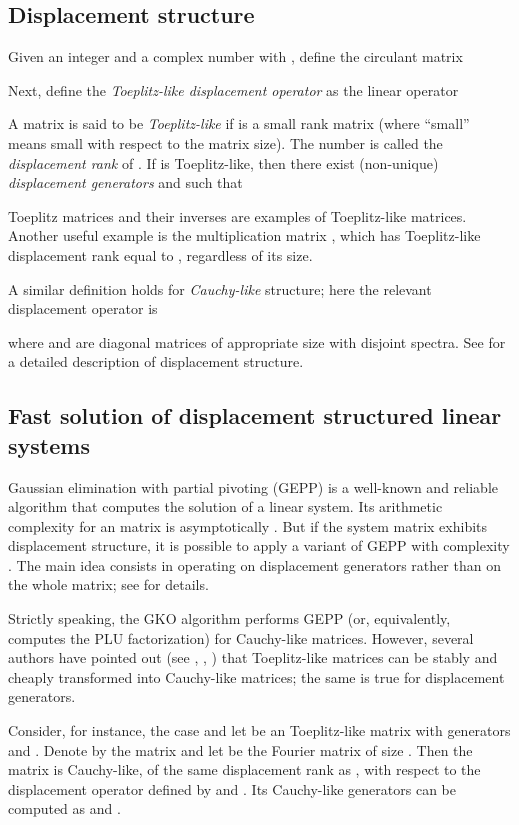 \documentclass{article}
\newcommand{\tmem}[1]{{\em #1\/}}
\begin{document}
\subsection{Displacement structure}

Given an integer  and a complex number  with , define the circulant matrix

Next, define the {\tmem{Toeplitz-like displacement operator}} as the linear
operator

A matrix  is said to be {\tmem{Toeplitz-like}}
if  is a small rank matrix (where ``small'' means small with
respect to the matrix size). The number  is
called the {\tmem{displacement rank}} of . If  is Toeplitz-like, then
there exist (non-unique) {\tmem{displacement generators}}  and  such
that

Toeplitz matrices and their inverses are examples of Toeplitz-like matrices.
Another useful example is the multiplication matrix , which has
Toeplitz-like displacement rank equal to , regardless of its size.

A similar definition holds for {\tmem{Cauchy-like}} structure; here the
relevant displacement operator is

where  and  are diagonal matrices of appropriate size with disjoint
spectra. See {\cite{KS}} for a detailed description of displacement structure.

\subsection{Fast solution of displacement structured linear systems}

Gaussian elimination with partial pivoting (GEPP) is a well-known and reliable
algorithm that computes the solution of a linear system. Its arithmetic
complexity for an  matrix is asymptotically .
But if the system matrix exhibits displacement structure, it is possible to
apply a variant of GEPP with complexity . The main idea
consists in operating on displacement generators rather than on the whole
matrix; see {\cite{GKO}} for details.

Strictly speaking, the GKO algorithm performs GEPP (or, equivalently,
computes the PLU factorization) for Cauchy-like matrices. However, several
authors have pointed out (see {\cite{GKO}}, {\cite{Hei}}, {\cite{Pan}}) that
Toeplitz-like matrices can be stably and cheaply transformed into Cauchy-like
matrices; the same is true for displacement generators.

Consider, for instance, the case  and let  be an  Toeplitz-like matrix with generators  and . Denote by  the
matrix  and let
 be the Fourier matrix of size . Then the matrix is Cauchy-like, of the same displacement rank as , with respect to the
displacement operator defined by  and . Its Cauchy-like generators can
be computed as  and .
\end{document}
